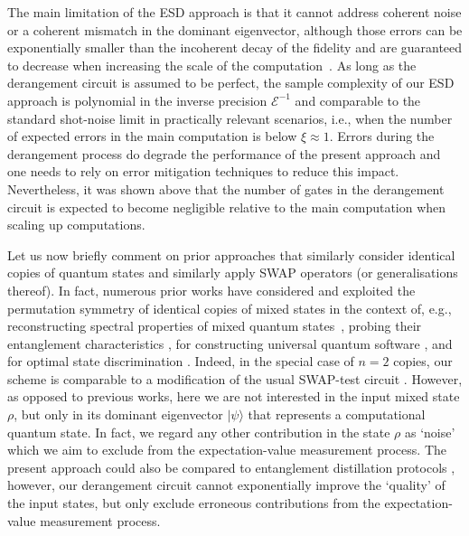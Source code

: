 \documentclass[aps,prx,showpacs,twocolumn,reprint]{revtex4-2}
\begin{document}
{The main limitation of the ESD approach is that it
cannot address coherent noise or a coherent mismatch in the dominant eigenvector,
although those errors can be exponentially smaller than the
incoherent decay of the fidelity and are guaranteed to
decrease when increasing the scale of the computation~\cite{koczor2021dominant}.
As long as the derangement circuit is assumed to be perfect, the sample complexity of
our ESD approach is  polynomial in the inverse precision $\mathcal{E}^{-1}$ and comparable to the standard shot-noise limit in
practically relevant scenarios, i.e., when the number of expected errors in the
main computation is below $\xi \approx 1$. Errors during the derangement process
do degrade the performance of the present approach and one needs to rely
on error mitigation techniques to reduce this impact. 
Nevertheless, it was shown above that the number of gates in the derangement
circuit is expected to become negligible relative to the main computation when scaling up computations.

Let us now briefly comment on prior approaches that similarly consider
identical copies of quantum states and similarly apply SWAP operators (or generalisations thereof).
In fact, numerous prior works have considered and exploited
the permutation symmetry of identical
copies of mixed states in the context of, e.g., reconstructing spectral properties of mixed
quantum states~\cite{ekert2002direct, PhysRevA.64.052311, marvian2014generalization, 9163139, PhysRevA.89.012117,christandl2007nonzero,christandl2006spectra},
probing their entanglement characteristics \cite{PhysRevA.68.052101, PhysRevLett.90.167901, PhysRevLett.89.127902},
for constructing universal quantum software \cite{PhysRevLett.89.190401},
and for optimal state discrimination \cite{PhysRevA.66.022112, PhysRevA.65.062320, PhysRevA.98.062318}.
Indeed, in the special case of $n=2$ copies, our scheme is comparable to a modification
of the usual SWAP-test circuit \cite{ekert2002direct}.
However, as opposed to previous works,
here we are not interested in the input mixed state $\rho$, but only in its dominant eigenvector $|\psi\rangle$
that represents a computational quantum state. In fact, we regard any other contribution 
in the state $\rho$ as `noise' which we aim to exclude from the expectation-value measurement process.
The present approach could also be compared to entanglement distillation protocols
\cite{PhysRevLett.76.722,kalb2017entanglement,deutsch1996quantum}, however, our derangement
circuit cannot exponentially improve the `quality' of the input states, but only exclude erroneous contributions
from the expectation-value measurement process.


}
\end{document}

